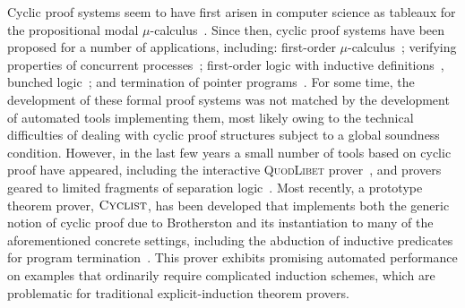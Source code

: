 \documentclass[11pt,twocolumn]{article}
\newcommand{\cyclist}{\textsc{Cyclist}}
\begin{document}
%
%

Cyclic proof systems seem to have first arisen in computer science as tableaux for the propositional modal $\mu$-calculus~\cite{Stirling-Walker:91}.  Since then, cyclic proof systems have been proposed for a number of applications, including: first-order $\mu$-calculus~\cite{Dam-Gurov:02};
verifying properties of concurrent processes~\cite{Schopp-Simpson:02}; first-order logic with inductive definitions~\cite{Bro05}, bunched logic~\cite{Brotherston:07}; and termination of pointer programs~\cite{BBC08}.  For some time, the development of these formal proof systems was not matched by the development of automated tools implementing them, most likely owing to the technical difficulties of dealing with cyclic proof structures subject to a global soundness condition.  However, in the last few years a small number of tools based on cyclic proof have appeared, including the interactive \textsc{QuodLibet} prover~\cite{Wirth-etal:03}, and provers geared to limited fragments of separation logic~\cite{Nguyen-Chin:08,Brotherston-Distefano-Petersen:11}. Most recently, a prototype theorem prover, $\cyclist$, has been developed that implements both the generic notion of cyclic proof due to Brotherston and its instantiation to many of the aforementioned concrete settings, including the abduction of inductive predicates for program termination~\cite{BGP12,BG12}.  This prover exhibits promising automated performance on examples that ordinarily require complicated induction schemes, which are problematic for traditional explicit-induction theorem provers.




\begingroup
\footnotesize
{}
\endgroup
\end{document}
